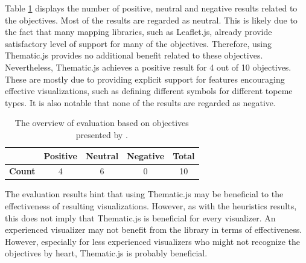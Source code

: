 Table \ref{table:objectivesevaluationoverview} displays the number of positive, neutral and negative results related to the objectives. Most of the results are regarded as neutral. This is likely due to the fact that many mapping libraries, such as Leaflet.js, already provide satisfactory level of support for many of the objectives. Therefore, using Thematic.js provides no additional benefit related to these objectives. Nevertheless, Thematic.js achieves a positive result for 4 out of 10 objectives. These are mostly due to providing explicit support for features encouraging effective visualizations, such as defining different symbols for different topeme types. It is also notable that none of the results are regarded as negative.

\begin{table}[h]
\centering
\begin{tabular}{|l|c|c|c|c|}
\hline
 & \textbf{Positive} & \textbf{Neutral} & \textbf{Negative} & \textbf{Total} \\ 
\hline
\textbf{Count} & 4 & 6 & 0 & 10 \\
\hline
\end{tabular}
\caption{The overview of evaluation based on objectives presented by \citet{schlichtmann_visualization_2002}.}
\label{table:objectivesevaluationoverview}
\end{table}

The evaluation results hint that using Thematic.js may be beneficial to the effectiveness of resulting visualizations. However, as with the heuristics results, this does not imply that Thematic.js is beneficial for every visualizer. An experienced visualizer may not benefit from the library in terms of effectiveness. However, especially for less experienced visualizers who might not recognize the objectives by heart, Thematic.js is probably beneficial.
